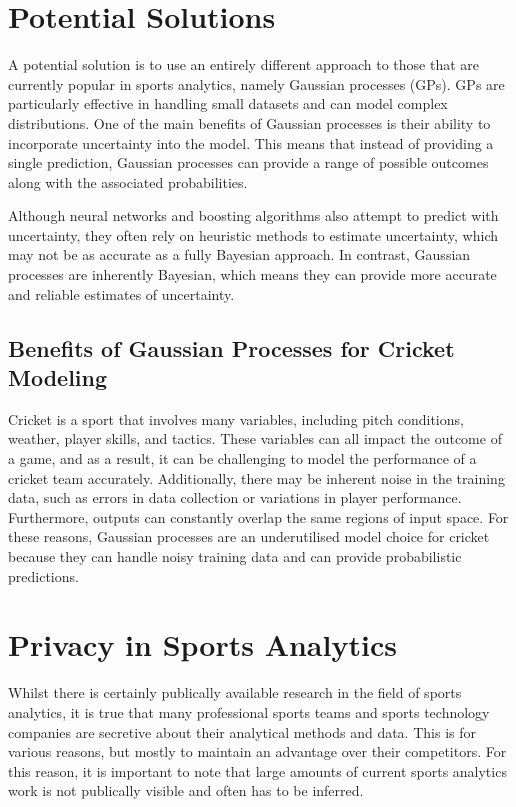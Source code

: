 \documentclass[12pt,a4paper]{report}
\theoremstyle{definition}
\begin{document}
\section{Potential Solutions}

A potential solution is to use an entirely different approach to those that are currently popular in sports analytics, namely Gaussian processes (GPs).
GPs are particularly effective in handling small datasets and can model complex distributions. 
One of the main benefits of Gaussian processes is their ability to incorporate uncertainty into the model. 
This means that instead of providing a single prediction, Gaussian processes can provide a range of possible outcomes along with the associated probabilities. 

Although neural networks and boosting algorithms also attempt to predict with uncertainty, they often rely on heuristic methods to estimate uncertainty, which may not be as accurate as a fully Bayesian approach. 
In contrast, Gaussian processes are inherently Bayesian, which means they can provide more accurate and reliable estimates of uncertainty.

\subsection{Benefits of Gaussian Processes for Cricket Modeling}

Cricket is a sport that involves many variables, including pitch conditions, weather, player skills, and tactics. 
These variables can all impact the outcome of a game, and as a result, it can be challenging to model the performance of a cricket team accurately. 
Additionally, there may be inherent noise in the training data, such as errors in data collection or variations in player performance.
Furthermore, outputs can constantly overlap the same regions of input space.
For these reasons, Gaussian processes are an underutilised model choice for cricket because they can handle noisy training data and can provide probabilistic predictions.

\section{Privacy in Sports Analytics}

Whilst there is certainly publically available research in the field of sports analytics, it is true that many professional sports teams and sports technology companies are secretive about their analytical methods and data. 
This is for various reasons, but mostly to maintain an advantage over their competitors.
For this reason, it is important to note that large amounts of current sports analytics work is not publically visible and often has to be inferred.
\end{document}
